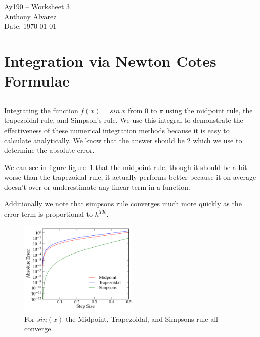 \documentclass[11pt,letterpaper]{article}
\begin{document}
\begin{center}
\Large
Ay190 -- Worksheet 3\\
Anthony Alvarez\\
Date: \today
\end{center}

\section{Integration via Newton Cotes Formulae}
\subsection{}

Integrating  the function $ f(x) = sin\ x$ from $0$ to $\pi$ using the midpoint
rule, the trapezoidal rule, and Simpson's rule. We use this integral to
demonstrate the effectiveness of these numerical integration methods because it 
is easy to calculate analytically. We know that the answer should be $2$ which
we use to determine the absolute error. 

We can see in figure figure~\ref{fig:sinx} that the midpoint rule, though it
should be a bit worse than the
trapezoidal rule, it actually performs better because it on average doesn't 
over or underestimate any linear term in a function. 

Additionally we note that simpsons rule converges much more quickly as the error
term is proportional to $h^{TK}$. 

\begin{figure}[bth]
\centering
\includegraphics[width=0.5\textwidth]{1a.pdf}
\caption{For $sin(x)$ the Midpoint, Trapezoidal,
             and Simpsons rule all converge.}
\label{fig:sinx}
\end{figure}

\subsection{}
\end{document}
